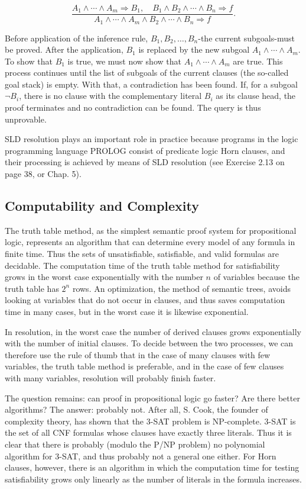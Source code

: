\documentclass[10pt]{article}
\begin{document}
$$
\frac{A_{1} \wedge \cdots \wedge A_{m} \Rightarrow B_{1}, \quad B_{1} \wedge B_{2} \wedge \cdots \wedge B_{n} \Rightarrow f}{A_{1} \wedge \cdots \wedge A_{m} \wedge B_{2} \wedge \cdots \wedge B_{n} \Rightarrow f} .
$$

Before application of the inference rule, $B_{1}, B_{2}, \ldots, B_{n}$-the current subgoals-must be proved. After the application, $B_{1}$ is replaced by the new subgoal $A_{1} \wedge \cdots \wedge A_{m}$. To show that $B_{1}$ is true, we must now show that $A_{1} \wedge \cdots \wedge A_{m}$ are true. This process continues until the list of subgoals of the current clauses (the so-called goal stack) is empty. With that, a contradiction has been found. If, for a subgoal $\neg B_{i}$, there is no clause with the complementary literal $B_{i}$ as its clause head, the proof terminates and no contradiction can be found. The query is thus unprovable.

SLD resolution plays an important role in practice because programs in the logic programming language PROLOG consist of predicate logic Horn clauses, and their processing is achieved by means of SLD resolution (see Exercise 2.13 on page 38, or Chap. 5).

\subsection*{Computability and Complexity}
The truth table method, as the simplest semantic proof system for propositional logic, represents an algorithm that can determine every model of any formula in finite time. Thus the sets of unsatisfiable, satisfiable, and valid formulas are decidable. The computation time of the truth table method for satisfiability grows in the worst case exponentially with the number $n$ of variables because the truth table has $2^{n}$ rows. An optimization, the method of semantic trees, avoids looking at variables that do not occur in clauses, and thus saves computation time in many cases, but in the worst case it is likewise exponential.

In resolution, in the worst case the number of derived clauses grows exponentially with the number of initial clauses. To decide between the two processes, we can therefore use the rule of thumb that in the case of many clauses with few variables, the truth table method is preferable, and in the case of few clauses with many variables, resolution will probably finish faster.

The question remains: can proof in propositional logic go faster? Are there better algorithms? The answer: probably not. After all, S. Cook, the founder of complexity theory, has shown that the 3-SAT problem is NP-complete. 3-SAT is the set of all CNF formulas whose clauses have exactly three literals. Thus it is clear that there is probably (modulo the P/NP problem) no polynomial algorithm for 3-SAT, and thus probably not a general one either. For Horn clauses, however, there is an algorithm in which the computation time for testing satisfiability grows only linearly as the number of literals in the formula increases.
\end{document}
